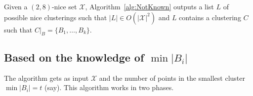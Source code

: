 \documentclass[11pt]{article}
\begin{document}
\begin{theorem}
Given a $(2,8)$-nice set $\mathcal{X}$, Algorithm~\ref{alg:NotKnown} outputs a list $L$ of possible nice clusterings such that $|L| \in O(|\mathcal{X}|^2)$ and $L$ contains a clustering $C$ such that $C|_B = \{B_1,\ldots,B_k\}$.
\end{theorem}

\subsection{Based on the knowledge of $\min |B_i|$}


The algorithm gets as input $\mathcal{X}$ and the number of points in the smallest cluster $\min |B_i| = t$ (say). This algorithm works in two phases.
\end{document}
